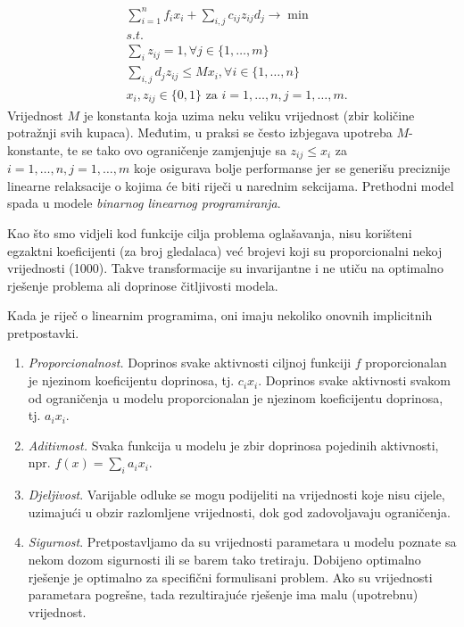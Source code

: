 \documentclass[a4paper, utf8, 11pt, colorlinks]{book}
\begin{document}
\begin{align*}
     &\sum_{i=1}^n f_i x_i  + \sum_{i,j} c_{ij} z_{ij} d_j \rightarrow \min\\
     & s.t. \nonumber \\
     & \sum_{i} z_{ij} = 1, \forall j\in\{1,\ldots,m\} \\
     & \sum_{i,j} d_j z_{ij} \leq M x_i, \forall i \in \{1,\ldots,n\} \\
     & x_i, z_{ij} \in \{0,1\} \mbox{ za } i = 1, \ldots, n, j = 1,  \ldots, m.
\end{align*}
Vrijednost $M$ je konstanta koja uzima neku veliku vrijednost (zbir količine potražnji svih kupaca). Međutim, u praksi se često izbjegava upotreba $M$-konstante, te se tako ovo ograničenje zamjenjuje sa $ z_{ij} \leq x_i$ 
za $ i = 1, \ldots, n, j = 1,  \ldots, m$ koje osigurava bolje performanse jer se generišu preciznije linearne relaksacije o kojima će biti riječi u narednim sekcijama. Prethodni model spada u modele \emph{binarnog linearnog programiranja}. 

Kao što smo vidjeli kod funkcije cilja problema oglašavanja,  
nisu korišteni egzaktni koeficijenti (za broj gledalaca) već brojevi koji su proporcionalni nekoj vrijednosti (1000). Takve transformacije su invarijantne i ne utiču na optimalno rješenje problema ali doprinose čitljivosti modela.
 
Kada je riječ o linearnim programima,  oni imaju nekoliko onovnih implicitnih pretpostavki. 
\begin{enumerate}
    \item \emph{Proporcionalnost.} Doprinos svake aktivnosti ciljnoj funkciji $f$ proporcionalan je njezinom koeficijentu doprinosa, tj. $c_ix_i$. Doprinos svake aktivnosti svakom od  ograničenja u modelu proporcionalan je njezinom  koeficijentu doprinosa, tj. $a_ix_i$.
    \item  \emph{Aditivnost.} Svaka funkcija u modelu je zbir  doprinosa pojedinih aktivnosti, npr. $f(x) = \sum_i a_i x_i$.
    \item \emph{Djeljivost}. Varijable odluke se mogu podijeliti na vrijednosti koje nisu cijele, uzimajući u obzir  razlomljene vrijednosti, dok god zadovoljavaju ograničenja. 
    \item \emph{Sigurnost}. Pretpostavljamo da su vrijednosti parametara u modelu poznate
    sa nekom dozom sigurnosti ili se barem tako tretiraju. Dobijeno optimalno rješenje je optimalno za specifični formulisani problem. Ako su vrijednosti parametara pogrešne, tada rezultirajuće rješenje ima malu (upotrebnu)  vrijednost.  
\end{enumerate}
\end{document}
